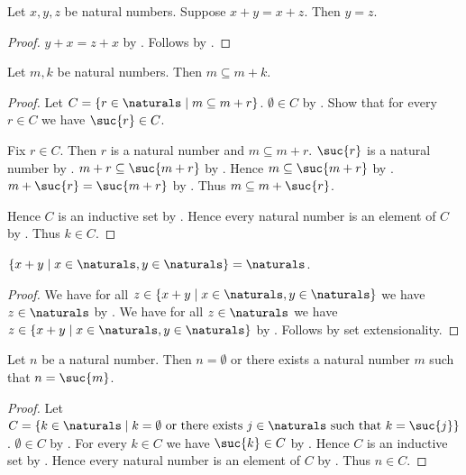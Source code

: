 \begin{corollary}\label{natural_addition_cancel_left}
    Let $x,y,z$ be natural numbers.
    Suppose $x+y=x+z$.
    Then $y=z$.
\end{corollary}
\begin{proof}
    $y+x=z+x$ by .
    Follows by .
\end{proof}

\begin{theorem}\label{natural_addition_left_subseteq_sum}
    Let $m,k$ be natural numbers.
    Then $m\subseteq m+k$.
\end{theorem}
\begin{proof}
    Let $C=\{r\in\naturals\mid \text{$m\subseteq m+r$}\}$.
    $\emptyset\in C$ by
        .
    Show that for every $r\in C$ we have $\suc{r}\in C$.
    \begin{subproof}
        Fix $r\in C$.
        Then $r$ is a natural number and $m\subseteq m+r$.
        $\suc{r}$ is a natural number by .
        $m+r\subseteq\suc{m+r}$ by .
        Hence $m\subseteq\suc{m+r}$ by .
        $m+\suc{r}=\suc{m+r}$
            by .
        Thus $m\subseteq m+\suc{r}$.
    \end{subproof}
    Hence $C$ is an inductive set by .
    Hence every natural number is an element of $C$
        by .
    Thus $k\in C$.
\end{proof}

\begin{lemma}\label{num_naturals_is_equal_to_two_times_naturals}
    $\{x+y \mid x \in \naturals, y \in \naturals \} = \naturals$.
\end{lemma}
\begin{proof}
    We have for all $z\in \{x+y \mid x \in \naturals, y \in \naturals \}$
        we have $z\in\naturals$ by .
    We have for all $z\in\naturals$
        we have $z\in \{x+y \mid x \in \naturals, y \in \naturals \}$
        by .
    Follows by set extensionality.
\end{proof}

\begin{theorem}\label{natural_zero_or_successor}
    Let $n$ be a natural number.
    Then $n=\emptyset$ or there exists a natural number $m$ such that
        $n=\suc{m}$.
\end{theorem}
\begin{proof}
    Let $C=\{k\in\naturals\mid
        \text{$k=\emptyset$ or there exists $j\in\naturals$ such that
            $k=\suc{j}$}\}$.
    $\emptyset\in C$ by .
    For every $k\in C$ we have $\suc{k}\in C$
        by .
    Hence $C$ is an inductive set by .
    Hence every natural number is an element of $C$
        by .
    Thus $n\in C$.
\end{proof}
